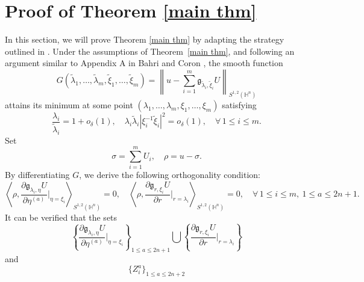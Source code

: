 \documentclass[11pt]{article}
\begin{document}
\section{Proof of Theorem \ref{main thm}}\label{sec5}
In this section, we will prove Theorem \ref{main thm} by adapting the strategy outlined in \cite{CFL25}.
Under the assumptions of Theorem~\ref{main thm}, and following an argument similar to Appendix A in Bahri and Coron \cite{BC88},  the smooth function
\begin{equation*}
G(\tilde{\lambda}_1, \ldots, \tilde{\lambda}_m, \tilde{\xi}_1, \ldots, \tilde{\xi}_m) = \left\| u - \sum_{i=1}^{m} \mathfrak{g}_{\tilde{\lambda}_i, \tilde{\xi}_i} U \right\|_{S^{1,2}(\mathbb{H}^{n})}
\end{equation*}
 attains its minimum at some point \((\lambda_1, \ldots, \lambda_m, \xi_1, \ldots, \xi_m)\) satisfying
\begin{equation*}
\frac{\lambda_i}{\tilde{\lambda}_i} = 1 + o_{\delta}(1),
\quad
\lambda_i \tilde{\lambda}_i |\xi_i^{-1}  \tilde{\xi}_i |^2 = o_{\delta}(1),
\quad \forall \, 1\leq i\leq m.
\end{equation*}
Set
\begin{equation*}
\sigma = \sum_{i=1}^{m} U_i,
\quad
\rho = u - \sigma.
\end{equation*}
By differentiating $G$, we derive the following orthogonality condition:
\begin{equation*}
\left\langle \rho, \frac{\partial \mathfrak{g}_{\lambda_i, \eta}U}{\partial \eta^{(a)}}\bigg|_{\eta=\xi_i} \right\rangle_{S^{1,2}(\mathbb{H}^{n})} = 0,
\quad
\left\langle \rho, \frac{\partial \mathfrak{g}_{r, \xi_i}U}{\partial r}\bigg|_{r=\lambda_i} \right\rangle_{S^{1,2}(\mathbb{H}^{n})} = 0,
\quad \forall\, 1\leq i\leq m,\ 1\leq a\leq 2n+1.
\end{equation*}
It can be verified that the sets
\begin{equation*}
  \left\{ \frac{\partial \mathfrak{g}_{\lambda_i, \eta}U}{\partial \eta^{(a)}}\bigg|_{\eta=\xi_i} \right\}_{1\leq a\leq 2n+1}
\bigcup
\left\{ \frac{\partial \mathfrak{g}_{r, \xi_i}U}{\partial r}\bigg|_{r=\lambda_i} \right\}
\end{equation*}
and
\begin{equation*}
  \{ Z_i^a \}_{1\leq a\leq 2n+2}
\end{equation*}
\end{document}
